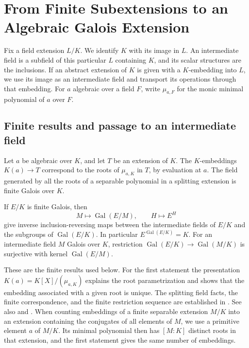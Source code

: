 \chapter[Finite subextensions]{From Finite Subextensions to an Algebraic Galois Extension}
\label{ch:finite-subextensions}

Fix a field extension \(L/K\). We identify \(K\) with its image in
\(L\). An intermediate field is a subfield of this particular \(L\)
containing \(K\), and its scalar structures are the inclusions. If an
abstract extension of \(K\) is given with a \(K\)-embedding into \(L\),
we use its image as an intermediate field and transport its operations
through that embedding. For \(a\) algebraic over a field \(F\), write
\(\mu_{a,F}\) for the monic minimal polynomial of \(a\) over \(F\).

\section{Finite results and passage to an intermediate field}

\begin{proposition}\label{res:F01}
Let \(a\) be algebraic over \(K\), and let \(T\) be an extension of
\(K\). The \(K\)-embeddings \(K(a)\to T\) correspond to the roots of
\(\mu_{a,K}\) in \(T\), by evaluation at \(a\). The field generated by
all the roots of a separable polynomial in a splitting extension is
finite Galois over \(K\).

If \(E/K\) is finite Galois, then
\[
 M\longmapsto\operatorname{Gal}(E/M),\qquad
 H\longmapsto E^H
\]
give inverse inclusion-reversing maps between the intermediate fields
of \(E/K\) and the subgroups of \(\operatorname{Gal}(E/K)\).
In particular \(E^{\operatorname{Gal}(E/K)}=K\).
For an intermediate field \(M\) Galois over \(K\), restriction
\(\operatorname{Gal}(E/K)\to\operatorname{Gal}(M/K)\) is surjective
with kernel \(\operatorname{Gal}(E/M)\).
\end{proposition}

These are the finite results used below. For the first statement the
presentation \(K(a)=K[X]/(\mu_{a,K})\) explains the root parametrization
and shows that the embedding associated with a given root is unique.
The splitting field facts, the finite correspondence, and the finite
restriction sequence are established in \cite[Chapters 12 and 14]{d07}.
See also \cite[Chapters 2 and 3]{milne} and
\cite[Tag 09DW]{stacks}. When counting embeddings of a finite
separable extension \(M/K\) into an extension containing the conjugates
of all elements of \(M\), we use a primitive element \(a\) of \(M/K\).
Its minimal polynomial then has \([M:K]\) distinct roots in that
extension, and the first statement gives the same number of embeddings.

